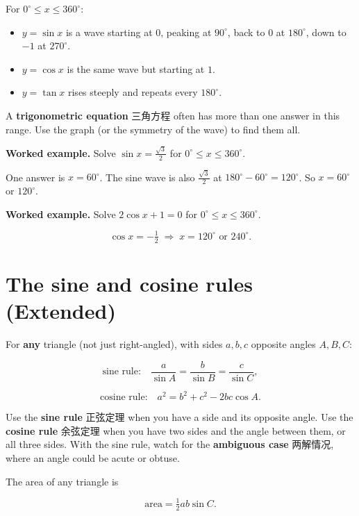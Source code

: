 \documentclass[11pt]{article}
\begin{document}
For $0^{\circ} \leqslant x \leqslant 360^{\circ}$:

\begin{itemize}
\item $y = \sin x$ is a wave starting at $0$, peaking at $90^{\circ}$, back to $0$ at $180^{\circ}$, down to $-1$ at $270^{\circ}$.

\item $y = \cos x$ is the same wave but starting at $1$.

\item $y = \tan x$ rises steeply and repeats every $180^{\circ}$.

\end{itemize}

A \textbf{trigonometric equation} 三角方程 often has more than one answer in this range. Use the graph (or the symmetry of the wave) to find them all.

\textbf{Worked example.} Solve $\sin x = \tfrac{\sqrt{3}}{2}$ for $0^{\circ} \leqslant x \leqslant 360^{\circ}$.

One answer is $x = 60^{\circ}$. The sine wave is also $\tfrac{\sqrt{3}}{2}$ at $180^{\circ} - 60^{\circ} = 120^{\circ}$. So $x = 60^{\circ}$ or $120^{\circ}$.

\textbf{Worked example.} Solve $2\cos x + 1 = 0$ for $0^{\circ} \leqslant x \leqslant 360^{\circ}$.

\[
\cos x = -\tfrac{1}{2} \;\Rightarrow\; x = 120^{\circ} \text{ or } 240^{\circ}.
\]

\section*{The sine and cosine rules (Extended)}

For \textbf{any} triangle (not just right-angled), with sides $a, b, c$ opposite angles $A, B, C$:

\[
\text{sine rule:}\quad \frac{a}{\sin A} = \frac{b}{\sin B} = \frac{c}{\sin C},
\]

\[
\text{cosine rule:}\quad a^{2} = b^{2} + c^{2} - 2bc\cos A.
\]

Use the \textbf{sine rule} 正弦定理 when you have a side and its opposite angle. Use the \textbf{cosine rule} 余弦定理 when you have two sides and the angle between them, or all three sides. With the sine rule, watch for the \textbf{ambiguous case} 两解情况, where an angle could be acute or obtuse.

The area of any triangle is

\[
\text{area} = \tfrac{1}{2}ab\sin C.
\]
\end{document}
